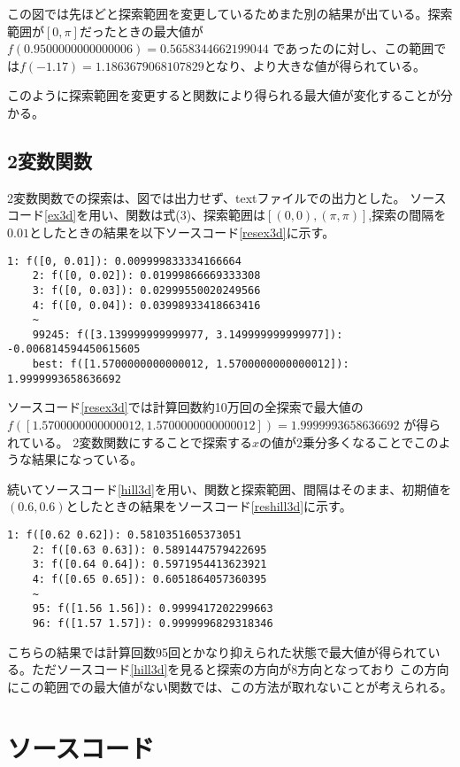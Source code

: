 \documentclass[a4paper,11pt,dvipdfmx]{jsarticle}
\begin{document}
この図では先ほどと探索範囲を変更しているためまた別の結果が出ている。探索範囲が$[0,\pi]$だったときの最大値が$f(0.9500000000000006)=0.5658344662199044$
であったのに対し、この範囲では$f(-1.17)=1.1863679068107829$となり、より大きな値が得られている。

このように探索範囲を変更すると関数により得られる最大値が変化することが分かる。

\subsection{2変数関数}
2変数関数での探索は、図では出力せず、textファイルでの出力とした。
ソースコード\ref{ex3d}を用い、関数は式(3)、探索範囲は$[(0,0),(\pi,\pi)]$,探索の間隔を$0.01$としたときの結果を以下ソースコード\ref{resex3d}に示す。
\begin{lstlisting}[caption={exsearch3d\_sin\_(0, 0)\_(3.14, 3.14)\_0.01.csv},label=resex3d]
    1: f([0, 0.01]): 0.009999833334166664
    2: f([0, 0.02]): 0.01999866669333308
    3: f([0, 0.03]): 0.02999550020249566
    4: f([0, 0.04]): 0.03998933418663416
    ~
    99245: f([3.139999999999977, 3.149999999999977]): -0.006814594450615605
    best: f([1.5700000000000012, 1.5700000000000012]): 1.9999993658636692
\end{lstlisting}
ソースコード\ref{resex3d}では計算回数約10万回の全探索で最大値の$f([1.5700000000000012, 1.5700000000000012])=1.9999993658636692$
が得られている。
2変数関数にすることで探索する$x$の値が2乗分多くなることでこのような結果になっている。

続いてソースコード\ref{hill3d}を用い、関数と探索範囲、間隔はそのまま、初期値を$(0.6,0.6)$としたときの結果をソースコード\ref{reshill3d}に示す。
\begin{lstlisting}[caption={hillclimib3d\_sin\_(0, 0)\_(3.14, 3.14)\_0.01\_(0.6 0.6).csv},label=reshill3d]
    1: f([0.62 0.62]): 0.5810351605373051
    2: f([0.63 0.63]): 0.5891447579422695
    3: f([0.64 0.64]): 0.5971954413623921
    4: f([0.65 0.65]): 0.6051864057360395
    ~
    95: f([1.56 1.56]): 0.9999417202299663
    96: f([1.57 1.57]): 0.9999996829318346
\end{lstlisting}
こちらの結果では計算回数95回とかなり抑えられた状態で最大値が得られている。ただソースコード\ref{hill3d}を見ると探索の方向が8方向となっており
この方向にこの範囲での最大値がない関数では、この方法が取れないことが考えられる。

\section{ソースコード}





\end{document}
